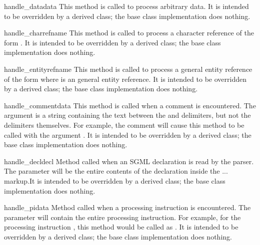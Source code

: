\begin{methoddesc}{handle_data}{data}
This method is called to process arbitrary data.  It is intended to be
overridden by a derived class; the base class implementation does
nothing.
\end{methoddesc}

\begin{methoddesc}{handle_charref}{name} This method is called to
process a character reference of the form .  It
is intended to be overridden by a derived class; the base class
implementation does nothing.  
\end{methoddesc}

\begin{methoddesc}{handle_entityref}{name} 
This method is called to process a general entity reference of the
form  where  is an general entity
reference.  It is intended to be overridden by a derived class; the
base class implementation does nothing.
\end{methoddesc}

\begin{methoddesc}{handle_comment}{data}
This method is called when a comment is encountered.  The
 argument is a string containing the text between the
\samp{--} and \samp{--} delimiters, but not the delimiters
themselves.  For example, the comment  will
cause this method to be called with the argument .  It is
intended to be overridden by a derived class; the base class
implementation does nothing.
\end{methoddesc}

\begin{methoddesc}{handle_decl}{decl}
Method called when an SGML declaration is read by the parser.  The
 parameter will be the entire contents of the declaration
inside the \code{<!}...\code{>} markup.It is intended to be overridden
by a derived class; the base class implementation does nothing.
\end{methoddesc}

\begin{methoddesc}{handle_pi}{data}
Method called when a processing instruction is encountered.  The
 parameter will contain the entire processing instruction.
For example, for the processing instruction ,
this method would be called as .  It
is intended to be overridden by a derived class; the base class
implementation does nothing.

\end{methoddesc}


